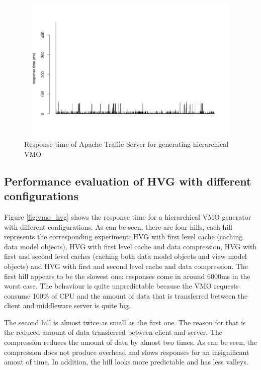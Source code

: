 \begin{figure}[h!]
    \centering
    \includegraphics[width=15cm,height=7cm,keepaspectratio]{images/vmo_ts_mult.png}
    \caption{Response time of Apache Traffic Server for generating hierarchical VMO}
    \label{fig:vmo_ts_mult}
\end{figure}

\subsection{Performance evaluation of HVG with different configurations}

Figure \ref{fig:vmo_hvg} shows the response time for a hierarchical VMO generator with different configurations. As can be seen, there are four hills, each hill represents the corresponding experiment: HVG with first level cache (caching data model objects), HVG with first level cache and data compression, HVG with first and second level caches (caching both data model objects and view model objects) and HVG with first and second level cache and data compression. The first hill appears to be the slowest one: responses come in around 6000ms in the worst case. The behaviour is quite unpredictable because the VMO requests consume 100\% of CPU and the amount of data that is transferred between the client and middleware server is quite big.


The second hill is almost twice as small as the first one. The reason for that is the reduced amount of data transferred between client and server. The compression reduces the amount of data by almost two times. As can be seen, the compression does not produce overhead and slows responses for an insignificant amout of time. In addition, the hill looks more predictable and has less valleys.  


